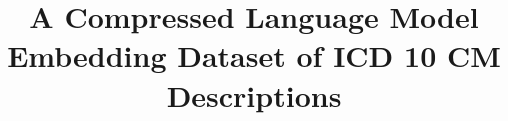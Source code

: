 \documentclass{bmcart}
\begin{document}
\begin{frontmatter}

\begin{fmbox}


\title{A Compressed Language Model Embedding Dataset of ICD 10 CM 
Descriptions}


\author[
  addressref={aff1},                   %
  corref={aff1},                       %
  email={michael.kane@yale.edu}   %
]{ }
\author[
  addressref={aff2,aff3},
  email={casey.king@yale.edu}
]{ }
\author[
  addressref={aff1},
  email={denise.esserman@yale.edu}
]{ }
\author[
  addressref={aff4},
  email={nklatham@bwh.harvard.edu}
]{ }
\author[
  addressref={aff1},
  email={erich.greene@yale.edu}
]{ }
\author[
  addressref={aff5},
  email={dganz@mednet.ucla.edu}
]{ }



\end{fmbox}
\end{frontmatter}
\end{document}

